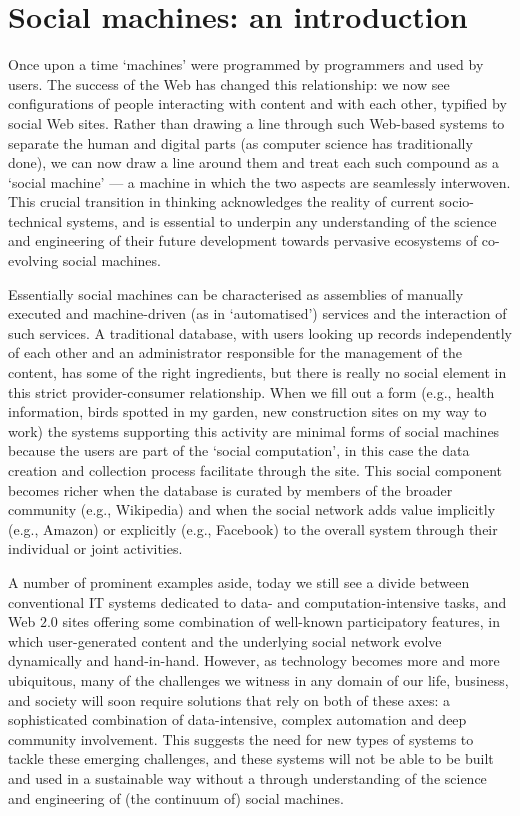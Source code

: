 \documentclass{sig-alternate}
\begin{document}


\section{Social machines: an introduction}
Once upon a time `machines' were programmed by programmers and used by users. The success of the Web has changed this relationship: we now see configurations of people interacting with content and with each other, typified by social Web sites. Rather than drawing a line through such Web-based systems to separate the human and digital parts (as computer science has traditionally done), we can now draw a line around them and treat each such compound as a `social machine' --- a machine in which the two aspects are seamlessly interwoven. This crucial transition in thinking acknowledges the reality of current socio-technical systems, and is essential to underpin any understanding of the science and engineering of their future development towards pervasive ecosystems of co-evolving social machines.

Essentially social machines can be characterised as assemblies of manually executed and machine-driven (as in `automatised') services and the interaction of such services. A traditional database, with users looking up records independently of each other and an administrator responsible for the management of the content, has some of the right ingredients, but there is really no social element in this strict provider-consumer relationship. When we fill out a form (e.g., health information, birds spotted in my garden, new construction sites on my way to work) the systems supporting this activity are minimal forms of social machines because the users are part of the `social computation', in this case the data creation and collection process facilitate through the site. This social component becomes richer when the database is curated by members of the broader community (e.g., Wikipedia) and when the social network adds value implicitly (e.g., Amazon) or explicitly (e.g., Facebook) to the overall system through their individual or joint activities.

A number of prominent examples aside, today we still see a divide between conventional IT systems dedicated to data- and computation-intensive tasks, and Web $2.0$ sites offering some combination of well-known participatory features, in which user-generated content and the underlying social network evolve dynamically and hand-in-hand. However, as technology becomes more and more ubiquitous, many of the challenges we witness in any domain of our life, business, and society will soon require solutions that rely on both of these axes: a sophisticated combination of data-intensive, complex automation and deep community involvement. This suggests the need for new types of systems to tackle these emerging challenges, and these systems will not be able to be built and used in a sustainable way without a through understanding of the science and engineering of (the continuum of) social machines.
\end{document}
